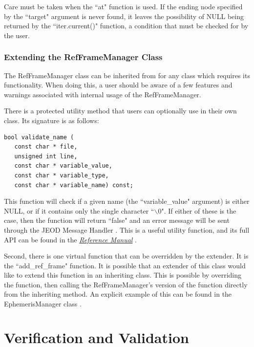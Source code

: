 Care must be taken when the
``at" function is used. If the ending node specified by the ``target" argument
is never found, it leaves the possibility of NULL being returned by
the ``iter.current()" function, a condition that must be checked for
by the user.

\subsection{Extending the RefFrameManager Class}

The RefFrameManager class can be inherited from for any class which requires
its functionality. When doing this, a user should be aware of a few features and
warnings associated with internal usage of the RefFrameManager.

There is a protected utility method that users can optionally use in their own
class. Its signature is as follows:

\begin{verbatim}
bool validate_name (
   const char * file,
   unsigned int line,
   const char * variable_value,
   const char * variable_type,
   const char * variable_name) const;
\end{verbatim}

This function will check if a given name (the ``variable\_value" argument) is either NULL, or
if it contains only the single character ``$\backslash$0". If either of these is the case, then the function
will return ``false" and an error message will be sent through the
JEOD Message Handler \cite{dynenv:MESSAGE}. This is a useful utility function, and its full API
can be found in the \href{file:refman.pdf} {\em Reference Manual}
\cite{refframesbib:ReferenceManual}.

Second, there is one virtual function that can be overridden by the extender. It is the
``add\_ref\_frame" function. It is possible that an extender of this class would like
to extend this function in an inheriting class. This is possible by overriding the function,
then calling the RefFrameManager's version of the function directly from the inheriting method.
An explicit example of this can be found in the EphemerisManager class \cite{dynenv:EPHEMERIDES}.


\chapter{Verification and Validation}\label{ch:ivv}

